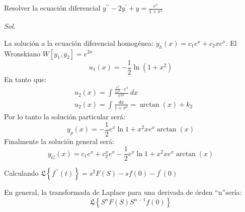 \begin{example}
    Resolver la ecuación diferencial $y^{\prime\prime}-2y^{\prime}+y=\frac{e^x}{1+x^2}$
\end{example}

\textit{ Sol. }

La solución a la ecuación diferencial homogénea: $y_h(x)=c_1e^x+c_2xe^x$.
El Wronskiano $W\left[y_1,y_2\right]=e^{2x}$
\begin{equation*}
    u_1(x) = - \frac{1}{2}\ln{(1+ x^2)}
\end{equation*}
En tanto que:
\begin{align*}
    &u_2(x) = \int \frac{\frac{e^x}{1 x^2}\cdot e^x}{e^{2x}}\,dx\\ 
    &u_2(x)=\int \frac{dx}{1 +x^2}=\arctan{(x)} +k_2
\end{align*}
Por lo tanto la solución particular será:
\begin{equation*}
    y_p(x) = -\frac{1}{2}e^x\ln{1 +x^2} xe^x\arctan{(x)}
\end{equation*}
Finalmente la solución general será:
\begin{equation*}
    y_G(x) = c_1e^x + c_2^xe^x -\frac{1}{2}e^x\ln{1 +x^2} xe^x\arctan{(x)}
\end{equation*}



Calculando $\mathfrak{L}\left\{f^{\prime\prime}(t)\right\}= s^2F(S)-sf(0)-f^{\prime}(0)$

En general, la transformada de Laplace para una derivada de órden ``n''sería:
\begin{equation}
    \mathfrak{L}\left\{S^nF(S) S^{n -1}f(0)  \right\}
\end{equation}

